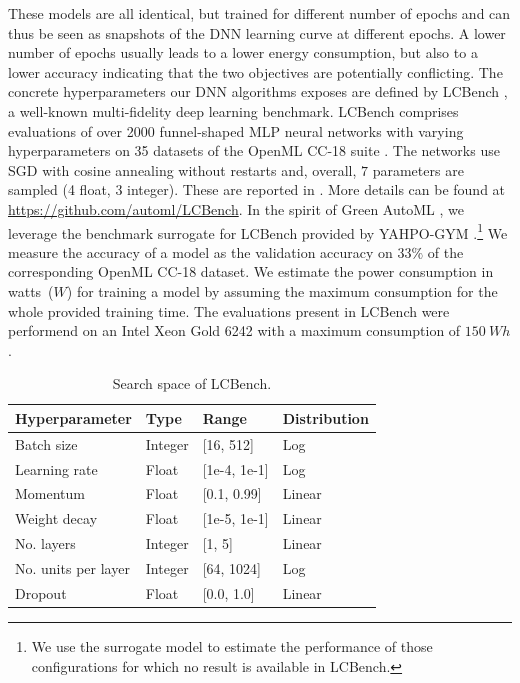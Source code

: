 These models are all identical, but trained for different number of epochs and can thus be seen as snapshots of the DNN learning curve \cite{mohr-arxiv22a} at different epochs. A lower number of epochs usually leads to a lower energy consumption, but also to a lower accuracy indicating that the two objectives are potentially conflicting. The concrete hyperparameters our DNN algorithms exposes are defined by LCBench \cite{zimmer-tpami21a}, a well-known multi-fidelity deep learning benchmark.
LCBench comprises evaluations of over 2000 funnel-shaped MLP neural networks with varying hyperparameters on 35 datasets of the OpenML CC-18 suite \cite{bischl-arxiv17a}.
The networks use SGD with cosine annealing without restarts and, overall, $7$ parameters are sampled (4 float, 3 integer).
These are reported in .
More details can be found at \url{https://github.com/automl/LCBench}.
In the spirit of Green AutoML \cite{tornede-jair23a}, we leverage the benchmark surrogate for LCBench provided by YAHPO-GYM \cite{pfisterer-arxiv21a}.\footnote{We use the surrogate model to estimate the performance of those configurations for which no result is available in LCBench.} We measure the accuracy of a model as the validation accuracy on $33\%$ of the corresponding OpenML CC-18 dataset. We estimate the power consumption in watts~($W$) for training a model by assuming the maximum consumption for the whole provided training time. The evaluations present in LCBench were performend on an Intel Xeon Gold 6242 with a maximum consumption of $150~Wh$.

\begin{table}[t]
    \centering
    \begin{tabular}{@{}llll@{}}
    \toprule
    Hyperparameter & Type & Range & Distribution \\ \midrule
    Batch size & Integer & [16, 512] & Log \\
    Learning rate & Float & [1e-4, 1e-1] & Log \\
    Momentum & Float & [0.1, 0.99] & Linear \\
    Weight decay & Float & [1e-5, 1e-1] & Linear \\
    No. layers & Integer & [1, 5] & Linear \\
    No. units per layer & Integer & [64, 1024] & Log \\
    Dropout & Float & [0.0, 1.0] & Linear \\\bottomrule
    \end{tabular}
    \caption{Search space of LCBench.}
    \label{moo-tbl:lc_bench_space}
    \end{table}


